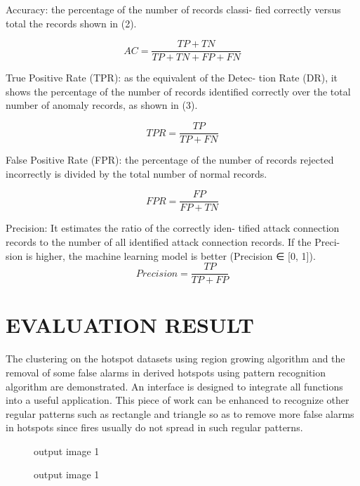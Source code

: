 \documentclass[12pt]{report}	%
\newcommand{\squeezeup}{\vspace{-0.6cm}}
\begin{document}
Accuracy: the percentage of the number of records classi-
fied correctly versus total the records shown in (2).

$$ AC=\frac{TP + TN}{TP + TN+FP+FN} $$

True Positive Rate (TPR): as the equivalent of the Detec-
tion Rate (DR), it shows the percentage of the number of
records identified correctly over the total number of anomaly
records, as shown in (3).

$$TPR=\frac{TP}{TP+FN} $$

False Positive Rate (FPR): the percentage of the number of
records rejected incorrectly is divided by the total number of normal records.

$$FPR=\frac{FP}{FP+TN}$$

Precision: It estimates the ratio of the correctly iden-
tified attack connection records to the number of
all identified attack connection records. If the Preci-
sion is higher, the machine learning model is better
(Precision ∈ [0, 1]).
$$ Precision =\frac{TP}{TP+FP} $$

\newpage
\chapter{EVALUATION RESULT}

The clustering on the hotspot datasets using region
growing algorithm and the removal of some false alarms
in derived hotspots using pattern recognition algorithm are
demonstrated. An interface is designed to integrate all
functions into a useful application. This piece of work can
be enhanced to recognize other regular patterns such as
rectangle and triangle so as to remove more false alarms
in hotspots since fires usually do not spread in such
regular patterns.

\begin{figure}[!h]
	\captionsetup{font=scriptsize}
	\begin{center}
		\centerline{}
		\caption{output image 1}
		\label{fig:8}
	\end{center}
	\squeezeup
\end{figure}

\begin{figure}[!h]
	\captionsetup{font=scriptsize}
	\begin{center}
		\centerline{}
		\caption{output image 1}
		\label{fig:8}
	\end{center}
	\squeezeup
\end{figure}
\end{document}
